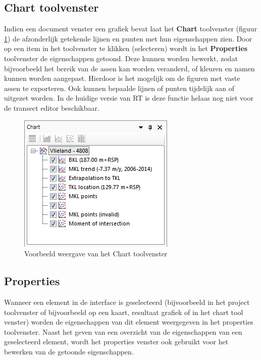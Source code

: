 \subsection{Chart toolvenster}
	\label{RT_Chart_Contents}
Indien een document venster een grafiek bevat laat het \textbf{Chart} toolvenster (figuur \ref{fig:3_Chart_Contents}) de afzonderlijk getekende lijnen en punten met hun eigenschappen zien. Door op een item in het toolvenster te klikken (selecteren) wordt in het \textbf{Properties} toolvenster de eigenschappen getoond. Deze kunnen worden bewerkt, zodat bijvoorbeeld het bereik van de assen kan worden veranderd, of kleuren en namen kunnen worden aangepast. Hierdoor is het mogelijk om de figuren met vaste assen te exporteren. Ook kunnen bepaalde lijnen of punten tijdelijk aan of uitgezet worden. In de huidige versie van RT is deze functie helaas nog niet voor de transect editor beschikbaar.

\begin{figure}[H]
	\centering
		\includegraphics{figures/chapter_general/Chart_Contents.png}
		\caption{Voorbeeld weergave van het Chart toolvenster}
	\label{fig:3_Chart_Contents}
\end{figure}

\subsection{Properties}
Wanneer een element in de interface is geselecteerd (bijvoorbeeld in het project toolvenster of bijvoorbeeld op een kaart, resultaat grafiek of in het chart tool venster) worden de eigenschappen van dit element weergegeven in het properties toolvenster. Naast het geven van een overzicht van de eigenschappen van een geselecteerd element, wordt het properties venster ook gebruikt voor het bewerken van de getoonde eigenschappen.

